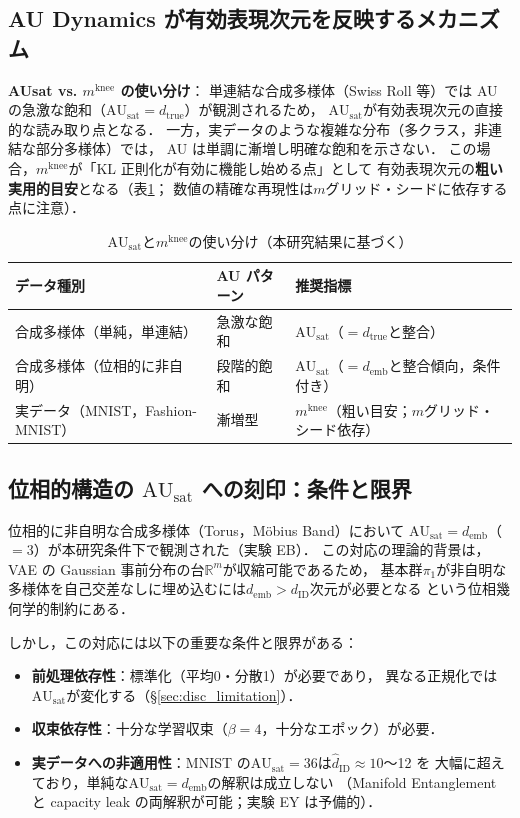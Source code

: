 \documentclass[11pt,a4paper]{jsarticle}
\newcommand{\dID}{d_{\mathrm{ID}}}
\newcommand{\dtrue}{d_{\mathrm{true}}}
\newcommand{\R}{\mathbb{R}}
\newcommand{\AUsat}{\mathrm{AU}_{\mathrm{sat}}}
\newcommand{\mknee}{m^{\mathrm{knee}}}
\newcommand{\demb}{d_{\mathrm{emb}}}
\begin{document}
\subsection{AU Dynamics が有効表現次元を反映するメカニズム}\label{sec:disc_au_dynamics}

\textbf{AUsat vs. $\mknee$ の使い分け}：
単連結な合成多様体（Swiss Roll 等）では AU の急激な飽和（$\AUsat = \dtrue$）が観測されるため，
$\AUsat$が有効表現次元の直接的な読み取り点となる．
一方，実データのような複雑な分布（多クラス，非連結な部分多様体）では，
AU は単調に漸増し明確な飽和を示さない．
この場合，$\mknee$が「KL 正則化が有効に機能し始める点」として
有効表現次元の\textbf{粗い実用的目安}となる（表\ref{tab:au_comparison}；
数値の精確な再現性は$m$グリッド・シードに依存する点に注意）．

\begin{table}[H]
\centering
\caption{$\AUsat$と$\mknee$の使い分け（本研究結果に基づく）}
\label{tab:au_comparison}
\small
\begin{tabular}{lll}
\toprule
データ種別 & AU パターン & 推奨指標 \\
\midrule
合成多様体（単純，単連結） & 急激な飽和 & $\AUsat$（$= \dtrue$と整合） \\
合成多様体（位相的に非自明） & 段階的飽和 & $\AUsat$（$= \demb$と整合傾向，条件付き） \\
実データ（MNIST，Fashion-MNIST） & 漸増型 & $\mknee$（粗い目安；$m$グリッド・シード依存） \\
\bottomrule
\end{tabular}
\end{table}

\subsection{位相的構造の $\AUsat$ への刻印：条件と限界}\label{sec:disc_topology}

位相的に非自明な合成多様体（Torus，Möbius Band）において
$\AUsat = \demb$（$= 3$）が本研究条件下で観測された（実験 EB）．
この対応の理論的背景は，VAE の Gaussian 事前分布の台$\R^m$が収縮可能であるため，
基本群$\pi_1$が非自明な多様体を自己交差なしに埋め込むには$\demb > \dID$次元が必要となる
という位相幾何学的制約\cite{hatcher2002algebraic,guillemin1974differential}にある．

しかし，この対応には以下の重要な条件と限界がある：
\begin{itemize}
  \item \textbf{前処理依存性}：標準化（平均0・分散1）が必要であり，
        異なる正規化では$\AUsat$が変化する（§\ref{sec:disc_limitation}）．
  \item \textbf{収束依存性}：十分な学習収束（$\beta = 4$，十分なエポック）が必要．
  \item \textbf{実データへの非適用性}：MNIST の$\AUsat = 36$は$\hat{d}_\mathrm{ID} \approx 10$〜12 を
        大幅に超えており，単純な$\AUsat = \demb$の解釈は成立しない
        （Manifold Entanglement と capacity leak の両解釈が可能；実験 EY は予備的）．
\end{itemize}
\end{document}
